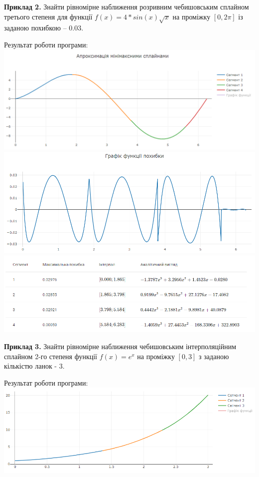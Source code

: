 \documentclass[ukrainian,14pt]{extarticle}
\begin{document}
\vspace{1cm}
\textbf{Приклад 2.} Знайти рівномірне наближення розривним чебишовським сплайном третього степеня для функції $f(x)=4*sin(x) \sqrt{x} $ на проміжку $[0, 2\pi]$ із заданою похибкою – $0.03$.

Результат роботи програми:
\vspace{0.5cm} \\
\includegraphics[scale=0.65]{examples/2_approx.png}
\vspace{0.5cm}
\includegraphics[scale=0.65]{examples/2_error.png}
\vspace{0.5cm}
\includegraphics[scale=0.7]{examples/2_table.png}
\vspace{1cm}

\newpage
\textbf{Приклад 3.} Знайти рівномірне наближення чебишовським інтерполяційним сплайном 2-го степеня функції $f(x)=e^x$ на проміжку $[0, 3]$ з заданою кількістю ланок - $3$.

Результат роботи програми:
\vspace{0.5cm} \\
\includegraphics[scale=0.65]{examples/3_approx.png}
\end{document}
